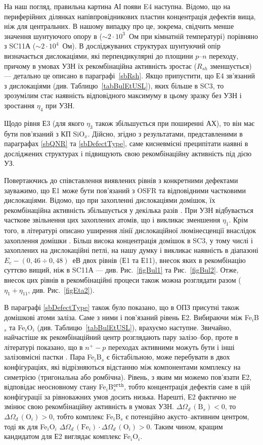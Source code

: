На наш погляд, правильна картина АІ появи E4 наступна.
Відомо, що на периферійних ділянках напівпровідникових пластин концентрація дефектів вища,
ніж для центральних.
В нашому випадку про це, зокрема, свідчить менше значення шунтуючого опору в ($\sim2\cdot10^{3}$~Ом при кімнатній температурі) порівняно з SC11А ($\sim2\cdot10^{4}$~Ом).
В досліджуваних структурах шунтуючий опір визначається дислокаціями, які перпендикулярні до площини $p$--$n$ переходу, причому в умовах УЗН їх рекомбінаційна активність зростає ($R_{sh}$ зменшується) --- детально це описано в параграфі~\ref{sbRsh}.
Якщо припустити, що Е4 зв'язаний з дислокаціями (див. Таблицю~\ref{tabBulEtUSL}), яких більше в SC3, то зрозумілим стає наявність відповідного максимуму в цьому зразку без УЗН і зростання $\eta_4$ при УЗН.

Щодо рівня Е3 (для якого $\eta_3$ також збільшується при поширенні АХ),
то він має бути пов'язаний з КП SiO$_x$.
Дійсно, згідно з результатами, представленими в параграфах \ref{sbQNR} та \ref{sbDefectType},
саме кисневмісні преципітати наявні в досліджених структурах і підвищують свою рекомбінаційну активність під дією УЗ.

Повертаючись до співставлення виявлених рівнів з конкретними дефектами зауважимо,
що Е1 може бути пов'язаний з OSFR та відповідними частковими дислокаціями.
Відомо, що при захопленні дислокаціями домішок, їх рекомбінаційна активність
збільшується у декілька разів \cite{disl10:Kveder,Kittler2003}.
При УЗН відбувається часткове звільнення цих захоплених атомів, що і викликає
зменшення  $\eta_1$.
Крім того, в літературі описано уширення  лінії дислокаційної люмінесценції внаслідок захоплення домішки  \cite{PhysRevB56:10208}.
Більш висока концентрація домішок в SC3, у тому числі і захоплених на дислокаційні петлі,
на нашу думку і викликає наявність в діапазоні $E_c-(0,46\div0,48)$~еВ двох рівнів (Е1 та Е11),
внесок яких в рекомбінацію суттєво вищий, ніж в SC11А --- див. Рис.~\ref{figBul1} та Рис.~\ref{figBul2}.
Отже, внесок цих рівнів в рекомбінаційні процеси також можна розглядати разом ($\eta_1+\eta_{11}$, див. Рис.~\ref{figEta2}).

В параграфі \ref{sbDefectType} також було показано, що в ОПЗ присутні також домішкові атоми заліза.
Саме з ними і пов'язаний рівень Е2.
Вибираючи між Fe$_i$B$_s$ та Fe$_i$O$_i$ (див. Таблицю~\ref{tabBulEtUSL}), врахуємо наступне.
Звичайно, найчастіше як рекомбінаційний центр розглядають пару залізо--бор,
проте в літературі показано, що в $n^+-p$ переходах активними можуть бути і інші
залізовмісні пастки \cite{TeimurazPSS,TeimurazJAP}.
Пара  Fe$_i$B$_s$ є бістабільною, може перебувати в двох конфігураціях, які відрізняються відстанню між компонентами комплексу на симетрією (тригональна або ромбічна).
Рівень, з яким ми можемо пов'язати Е2, відповідає неосновному стану Fe$_i$B$_s^\mathtt{orth}$, тобто концентрація дефектів саме в цій конфігурації за рівноважних умов досить низька.
Нарешті, Е2 фактично не змінює свою рекомбінаційну активність в умовах УЗН.
$\Delta\Omega_d\,(\mbox{B}_s)<0$, то $\Delta\Omega_d\,(\mbox{O}_i)>0$, тобто комплекс
Fe$_i$B$_s$ є потенційно акусто--активним центром, тоді як для Fe$_i$O$_i$
$\Delta\Omega_d\,(\mbox{Fe}_i)\cdot\Delta\Omega_d\,(\mbox{O}_i)>0$.
Таким чином, кращим кандидатом для Е2 виглядає комплекс Fe$_i$O$_i$.

